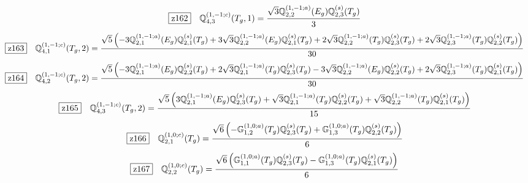 \documentclass[fleqn,10pt,landscape]{jsarticle}
\begin{document}
\begin{dmath*}
\hspace*{3mm}\fbox{z162}\quad \mathbb{Q}_{4,3}^{(1,-1;c)}(T_{g},1)=\frac{\sqrt{3} \mathbb{Q}_{2,2}^{(1,-1;a)}(E_{g}) \mathbb{Q}_{2,3}^{(s)}(T_{g})}{3}
\end{dmath*}
\begin{dmath*}
\hspace*{3mm}\fbox{z163}\quad \mathbb{Q}_{4,1}^{(1,-1;c)}(T_{g},2)=\frac{\sqrt{5} \left(- 3 \mathbb{Q}_{2,1}^{(1,-1;a)}(E_{g}) \mathbb{Q}_{2,1}^{(s)}(T_{g}) + 3 \sqrt{3} \mathbb{Q}_{2,2}^{(1,-1;a)}(E_{g}) \mathbb{Q}_{2,1}^{(s)}(T_{g}) + 2 \sqrt{3} \mathbb{Q}_{2,2}^{(1,-1;a)}(T_{g}) \mathbb{Q}_{2,3}^{(s)}(T_{g}) + 2 \sqrt{3} \mathbb{Q}_{2,3}^{(1,-1;a)}(T_{g}) \mathbb{Q}_{2,2}^{(s)}(T_{g})\right)}{30}
\end{dmath*}
\begin{dmath*}
\hspace*{3mm}\fbox{z164}\quad \mathbb{Q}_{4,2}^{(1,-1;c)}(T_{g},2)=\frac{\sqrt{5} \left(- 3 \mathbb{Q}_{2,1}^{(1,-1;a)}(E_{g}) \mathbb{Q}_{2,2}^{(s)}(T_{g}) + 2 \sqrt{3} \mathbb{Q}_{2,1}^{(1,-1;a)}(T_{g}) \mathbb{Q}_{2,3}^{(s)}(T_{g}) - 3 \sqrt{3} \mathbb{Q}_{2,2}^{(1,-1;a)}(E_{g}) \mathbb{Q}_{2,2}^{(s)}(T_{g}) + 2 \sqrt{3} \mathbb{Q}_{2,3}^{(1,-1;a)}(T_{g}) \mathbb{Q}_{2,1}^{(s)}(T_{g})\right)}{30}
\end{dmath*}
\begin{dmath*}
\hspace*{3mm}\fbox{z165}\quad \mathbb{Q}_{4,3}^{(1,-1;c)}(T_{g},2)=\frac{\sqrt{5} \left(3 \mathbb{Q}_{2,1}^{(1,-1;a)}(E_{g}) \mathbb{Q}_{2,3}^{(s)}(T_{g}) + \sqrt{3} \mathbb{Q}_{2,1}^{(1,-1;a)}(T_{g}) \mathbb{Q}_{2,2}^{(s)}(T_{g}) + \sqrt{3} \mathbb{Q}_{2,2}^{(1,-1;a)}(T_{g}) \mathbb{Q}_{2,1}^{(s)}(T_{g})\right)}{15}
\end{dmath*}
\begin{dmath*}
\hspace*{3mm}\fbox{z166}\quad \mathbb{Q}_{2,1}^{(1,0;c)}(T_{g})=\frac{\sqrt{6} \left(- \mathbb{G}_{1,2}^{(1,0;a)}(T_{g}) \mathbb{Q}_{2,3}^{(s)}(T_{g}) + \mathbb{G}_{1,3}^{(1,0;a)}(T_{g}) \mathbb{Q}_{2,2}^{(s)}(T_{g})\right)}{6}
\end{dmath*}
\begin{dmath*}
\hspace*{3mm}\fbox{z167}\quad \mathbb{Q}_{2,2}^{(1,0;c)}(T_{g})=\frac{\sqrt{6} \left(\mathbb{G}_{1,1}^{(1,0;a)}(T_{g}) \mathbb{Q}_{2,3}^{(s)}(T_{g}) - \mathbb{G}_{1,3}^{(1,0;a)}(T_{g}) \mathbb{Q}_{2,1}^{(s)}(T_{g})\right)}{6}
\end{dmath*}
\end{document}
